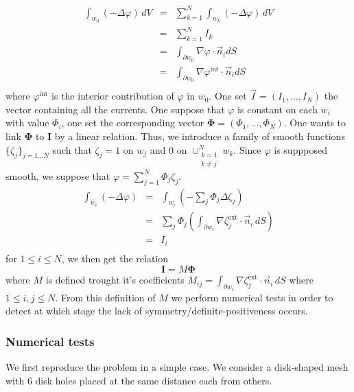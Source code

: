 \begin{equation}
  \label{eq:traceeqnw0}
  \begin{array}{rcl}
    \int_{w_0} (-\Delta \varphi) \, dV &=& \sum_{k=1}^N \int_{w_k} (-\Delta \varphi) \, dV \\
                                      &=& \sum_{k=1}^N I_k \\
                                      &=& \int_{\partial w_0} \nabla \varphi \cdot \vec{n}_i dS \\
                                      &=& \int_{\partial w_0} \nabla \varphi^{\text{int}} \cdot \vec{n}_i dS \\
  \end{array}
\end{equation}
where $\varphi^{\text{int}}$ is the interior contribution of $\varphi$ in $w_0$. One set $\vec{I}=(I_1,...,I_N)$ the vector containing all the currents. One suppose that $\varphi$ is constant on each $w_i$ with value $\Phi_i$, one set the corresponding vector $\mathbf{\Phi}=(\Phi_1,...,\Phi_N)$. One wants to link $\mathbf{\Phi}$ to $\mathbf{I}$ by a linear relation. Thus, we introduce a family of smooth functions $\{ \zeta_j \}_{j=1...N}$ such that $\zeta_j = 1 $ on $w_j$ and 0 on $\cup_{\substack{k=1 \\ k\ne j}}^N w_k$. Since $\varphi$ is suppposed smooth, we suppose that $\varphi = \sum_{j=1}^N \Phi_j \zeta_j$.
\begin{equation}
  \label{eq:derive.cap}
  \begin{array}{rcl}
    \int_{w_i} (-\Delta \varphi)  &=& \int_{w_i} (- \sum_j \Phi_j \Delta \zeta_j) \\
                                  &=& \sum_j \Phi_j \left( \int_{\partial w_i} \nabla \zeta^{\text{ext}}_j \cdot \vec{n}_i \, dS \right) \\
                                  &=& I_i \\
  \end{array}
\end{equation}
for $1\le i \le N$,  we then get the relation 
\[
\mathbf{I} = M \mathbf{\Phi}
\]
where $M$ is defined trought it's coefficients $M_{ij}=\int_{\partial w_i} \nabla \zeta^{\text{ext}}_j \cdot \vec{n}_i \, dS$ where $1\le i,j \le N$. From this definition of $M$ we perform numerical tests in order to detect at which stage the lack of symmetry/definite-positiveness occurs.

\subsubsection*{Numerical tests}
We first reproduce the problem in a simple case. We consider a disk-shaped mesh with 6 disk holes placed at the same distance each from others. 


